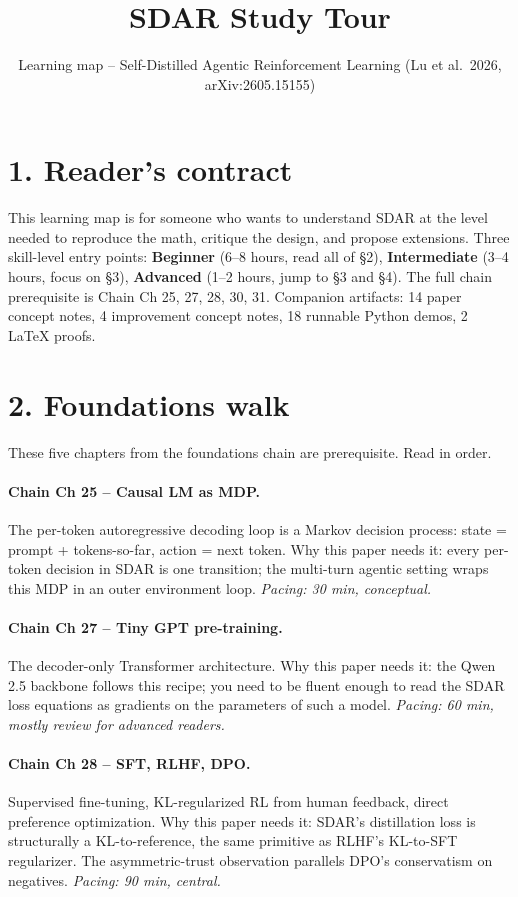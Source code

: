 \documentclass[11pt]{article}
\title{SDAR Study Tour}
\author{Learning map -- Self-Distilled Agentic Reinforcement Learning (Lu et al.~2026, arXiv:2605.15155)}
\date{}
\begin{document}
\maketitle

\section*{1. Reader's contract}

This learning map is for someone who wants to understand SDAR at the level needed to reproduce the math, critique the design, and propose extensions. Three skill-level entry points: \textbf{Beginner} (6--8 hours, read all of \S2), \textbf{Intermediate} (3--4 hours, focus on \S3), \textbf{Advanced} (1--2 hours, jump to \S3 and \S4). The full chain prerequisite is Chain Ch 25, 27, 28, 30, 31. Companion artifacts: 14 paper concept notes, 4 improvement concept notes, 18 runnable Python demos, 2 LaTeX proofs.

\section*{2. Foundations walk}

These five chapters from the foundations chain are prerequisite. Read in order.

\paragraph{Chain Ch 25 -- Causal LM as MDP.} The per-token autoregressive decoding loop is a Markov decision process: state = prompt + tokens-so-far, action = next token. Why this paper needs it: every per-token decision in SDAR is one transition; the multi-turn agentic setting wraps this MDP in an outer environment loop. \emph{Pacing: 30 min, conceptual.}

\paragraph{Chain Ch 27 -- Tiny GPT pre-training.} The decoder-only Transformer architecture. Why this paper needs it: the Qwen 2.5 backbone follows this recipe; you need to be fluent enough to read the SDAR loss equations as gradients on the parameters of such a model. \emph{Pacing: 60 min, mostly review for advanced readers.}

\paragraph{Chain Ch 28 -- SFT, RLHF, DPO.} Supervised fine-tuning, KL-regularized RL from human feedback, direct preference optimization. Why this paper needs it: SDAR's distillation loss is structurally a KL-to-reference, the same primitive as RLHF's KL-to-SFT regularizer. The asymmetric-trust observation parallels DPO's conservatism on negatives. \emph{Pacing: 90 min, central.}
\end{document}
